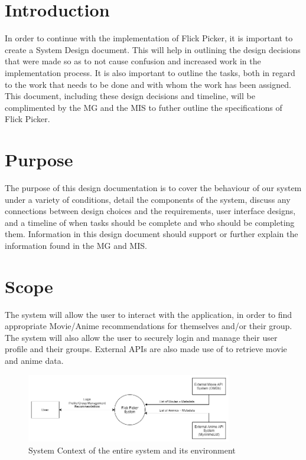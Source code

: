 \documentclass[12pt, titlepage]{article}
\begin{document}
\section{Introduction}
\hspace*{14pt} In order to continue with the implementation of Flick Picker, it is important to create a System Design document. This will help in outlining the design decisions that were made so as to not cause confusion and increased work in the implementation process. It is also important to outline the tasks, both in regard to the work that needs to be done and with whom the work has been assigned. This document, including these design decisions and timeline, will be complimented by the MG and the MIS to futher outline the specifications of Flick Picker. 

\section{Purpose}
\hspace*{14pt} The purpose of this design documentation is to cover the behaviour of our system under a variety of conditions, detail the components of the system, discuss any connections between design choices and the requirements, user interface designs, and a timeline of when tasks should be complete and who should be completing them. Information in this design document should support or further explain the information found in the MG and MIS.

\section{Scope}

The system will allow the user to interact with the application, in order to find appropriate Movie/Anime recommendations for themselves and/or their group. The system will also allow the user to securely login and manage their user profile and their groups. External APIs are also made use of to retrieve movie and anime data.

\begin{figure}[H]
	\centering
	\includegraphics[width=0.8\textwidth]{SystemContext.png}
	\caption{System Context of the entire system and its environment}
	\label{FigUH}
\end{figure}
\end{document}
